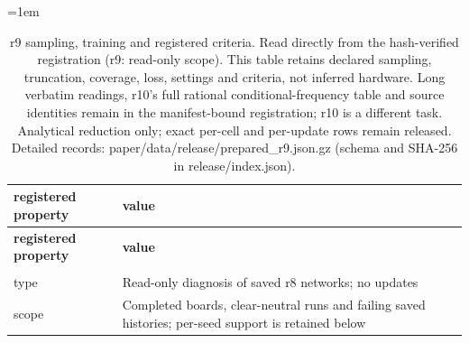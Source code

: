 \begingroup\fontsize{8}{9.5}\selectfont\setlength{\tabcolsep}{3pt}\emergencystretch=1em
\begin{longtable}{@{}>{\raggedright\arraybackslash}p{2.000in}>{\raggedright\arraybackslash}p{3.900in}@{}}
\caption{r9 sampling, training and registered criteria. Read directly from the hash-verified registration (r9: read-only scope). This table retains declared sampling, truncation, coverage, loss, settings and criteria, not inferred hardware. Long verbatim readings, r10's full rational conditional-frequency table and source identities remain in the manifest-bound registration; r10 is a different task. Analytical reduction only; exact per-cell and per-update rows remain released. Detailed records: paper/\allowbreak{}data/\allowbreak{}release/\allowbreak{}prepared\_\allowbreak{}r9.json.gz (schema and SHA-256 in release/\allowbreak{}index.json).}\label{tab:prepared_r9}\\
\toprule
\textbf{registered property} & \textbf{value} \\
\midrule\endfirsthead
\toprule
\textbf{registered property} & \textbf{value} \\
\midrule\endhead
\midrule\multicolumn{2}{r}{Continued on next page}\\\endfoot
\bottomrule\endlastfoot
type & Read-only diagnosis of saved r8 networks; no updates \\*
scope & Completed boards, clear-neutral runs and failing saved histories; per-seed support is retained below \\
\end{longtable}
\endgroup
